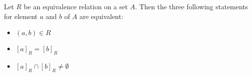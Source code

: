 \begin{theorem}
    Let $R$ be an equivalence relation on a set $A$. Then the three following statements for element $a$ and $b$ of $A$ are equivalent:
    \begin{itemize}[itemsep=1pt,label=$\circ$]
        \item $(a,b) \in R$
        \item $[a]_R = [b]_R$
        \item $[a]_R \cap [b]_R \neq \emptyset$
    \end{itemize}
\end{theorem}